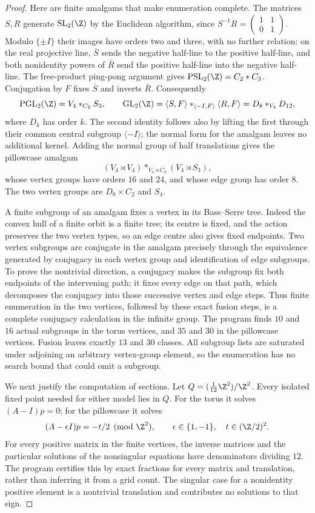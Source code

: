 \begin{proof}
Here are finite amalgams that make enumeration complete.  The matrices
$S,R$ generate $\mathrm{SL}_2(\Z)$ by the Euclidean algorithm, since
$S^{-1}R=\left(\begin{smallmatrix}1&1\\0&1\end{smallmatrix}\right)$.
Modulo $\{\pm I\}$ their images have orders two and three, with no
further relation: on the real projective line, $\bar S$ sends the negative
half-line to the positive half-line, and both nonidentity powers of
$\bar R$ send the positive half-line into the negative half-line.  The
free-product ping-pong argument gives
$\mathrm{PSL}_2(\Z)=C_2*C_3$.
Conjugation by $F$ fixes $\bar S$ and inverts $\bar R$.  Consequently
\[
 \mathrm{PGL}_2(\Z)=V_4*_{C_2}S_3,
 \qquad
 \mathrm{GL}_2(\Z)=\langle S,F\rangle
       *_{\langle-I,F\rangle}\langle R,F\rangle
       =D_8*_{V_4}D_{12},
\]
where $D_k$ has order $k$.  The second identity follows also by lifting
the first through their common central subgroup $\langle-I\rangle$;
the normal form for the amalgam leaves no additional kernel.
Adding the normal group of half translations gives the pillowcase amalgam
\[
 (V_4\rtimes V_4)*_{V_4\rtimes C_2}(V_4\rtimes S_3),
\]
whose vertex groups have orders $16$ and $24$, and whose edge group has
order $8$.  The two vertex groups are $D_8\times C_2$ and $S_4$.

A finite subgroup of an amalgam fixes a vertex in its Bass--Serre tree.
Indeed the convex hull of a finite orbit is a finite tree; its centre is
fixed, and the action preserves the two vertex types, so an edge centre
also gives fixed endpoints.  Two vertex subgroups are conjugate in the
amalgam precisely through the equivalence generated by conjugacy in
each vertex group and identification of edge subgroups.  To prove the
nontrivial direction, a conjugacy makes the subgroup fix both endpoints
of the intervening path; it fixes every edge on that path, which
decomposes the conjugacy into those successive vertex and edge steps.
Thus finite enumeration in the two vertices, followed by these exact
fusion steps, is a complete conjugacy calculation in the infinite group.
The program finds $10$ and $16$ actual subgroups in the torus vertices,
and $35$ and $30$ in the pillowcase vertices.  Fusion leaves exactly
$13$ and $30$ classes.  All subgroup lists are saturated under adjoining
an arbitrary vertex-group element, so the enumeration has no search bound
that could omit a subgroup.

We next justify the computation of sections.  Let
$Q=(\tfrac1{12}\Z^2)/\Z^2$.  Every isolated fixed point needed for
either model lies in $Q$.  For the torus it solves $(A-I)p=0$; for the
pillowcase it solves
\[
 (A-\epsilon I)p=-t/2\pmod{\Z^2},\qquad
 \epsilon\in\{1,-1\},\quad t\in(\Z/2)^2.
\]
For every positive matrix in the finite vertices, the inverse matrices
and the particular solutions of the nonsingular equations have
denominators dividing $12$.  The program certifies this by exact
fractions for every matrix and translation, rather than inferring it
from a grid count.  The singular case for a nonidentity positive element
is a nontrivial translation and contributes no solutions to that sign.


\end{proof}
